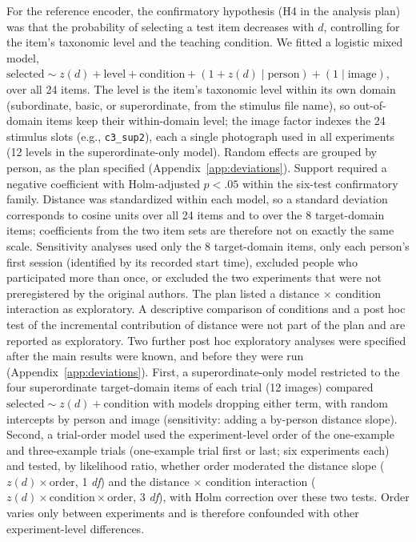 \documentclass[11pt]{article}
\begin{document}
For the reference encoder, the confirmatory hypothesis (H4 in the analysis plan) was that the probability of selecting a test item decreases with $d$, controlling for the item's taxonomic level and the teaching condition. We fitted a logistic mixed model, $\mathrm{selected} \sim z(d) + \mathrm{level} + \mathrm{condition} + (1 + z(d) \mid \mathrm{person}) + (1 \mid \mathrm{image})$, over all 24 items. The level is the item's taxonomic level within its own domain (subordinate, basic, or superordinate, from the stimulus file name), so out-of-domain items keep their within-domain level; the image factor indexes the 24 stimulus slots (e.g., \texttt{c3\_sup2}), each a single photograph used in all experiments (12 levels in the superordinate-only model). Random effects are grouped by person, as the plan specified (Appendix~\ref{app:deviations}). Support required a negative coefficient with Holm-adjusted $p < .05$ within the six-test confirmatory family. Distance was standardized within each model, so a standard deviation corresponds to \SDdAll{} cosine units over all 24 items and to \SDdTarget{} over the 8 target-domain items; coefficients from the two item sets are therefore not on exactly the same scale. Sensitivity analyses used only the 8 target-domain items, only each person's first session (identified by its recorded start time), excluded people who participated more than once, or excluded the two experiments that were not preregistered by the original authors. The plan listed a distance $\times$ condition interaction as exploratory. A descriptive comparison of conditions and a post hoc test of the incremental contribution of distance were not part of the plan and are reported as exploratory. Two further post hoc exploratory analyses were specified after the main results were known, and before they were run (Appendix~\ref{app:deviations}). First, a superordinate-only model restricted to the four superordinate target-domain items of each trial (12 images) compared $\mathrm{selected} \sim z(d) + \mathrm{condition}$ with models dropping either term, with random intercepts by person and image (sensitivity: adding a by-person distance slope). Second, a trial-order model used the experiment-level order of the one-example and three-example trials (one-example trial first or last; six experiments each) and tested, by likelihood ratio, whether order moderated the distance slope ($z(d) \times \mathrm{order}$, 1 \textit{df}) and the distance $\times$ condition interaction ($z(d) \times \mathrm{condition} \times \mathrm{order}$, 3 \textit{df}), with Holm correction over these two tests. Order varies only between experiments and is therefore confounded with other experiment-level differences.
\end{document}
